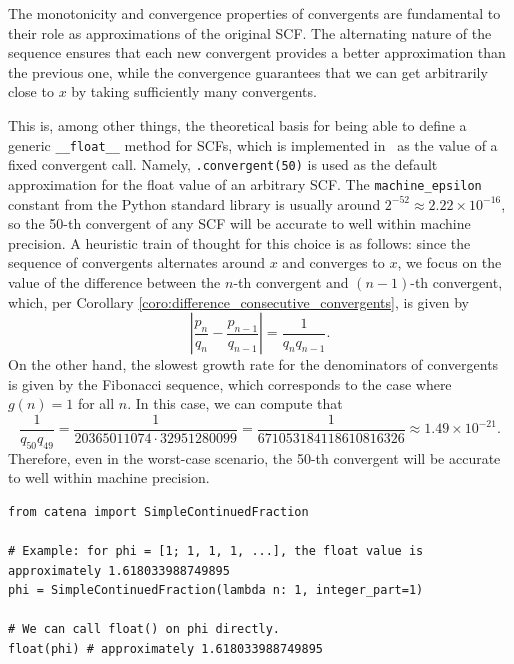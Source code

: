 \begin{remark}
    The monotonicity and convergence properties of convergents are fundamental to their role as approximations of the original SCF. 
    The alternating nature of the sequence ensures that each new convergent provides a better approximation than the previous one, 
    while the convergence guarantees that we can get arbitrarily close to $x$ by taking sufficiently many convergents.

    This is, among other things, the theoretical basis for being able to define a generic \texttt{\_\_float\_\_} method for SCFs, 
    which is implemented in \catena\ as the value of a fixed convergent call. Namely, \texttt{.convergent(50)} is used as the 
    default approximation for the float value of an arbitrary SCF. The \texttt{machine\_epsilon} constant from the 
    Python standard library is usually around $2^{-52} \approx 2.22 \times 10^{-16}$, so the 50-th 
    convergent of any SCF will be accurate to well within machine precision. A heuristic train of thought for this choice 
    is as follows: since the sequence of convergents alternates around $x$ and converges to $x$, we 
    focus on the value of the difference between the $n$-th convergent and $(n-1)$-th convergent, which, per Corollary \ref{coro:difference_consecutive_convergents}, is given by
    \[
        \left| \frac{p_n}{q_n} - \frac{p_{n-1}}{q_{n-1}} \right| = \frac{1}{q_n q_{n-1}}.
    \]
    On the other hand, the slowest growth rate for the denominators of convergents is given by the Fibonacci sequence, 
    which corresponds to the case where $g(n) = 1$ for all $n$. In this case, we can compute that
    \[
        \frac{1}{q_{50} q_{49}} = \frac{1}{20365011074 \cdot 32951280099} = \frac{1}{671053184118610816326} \approx 1.49 \times 10^{-21}.
    \]
    Therefore, even in the worst-case scenario, the 50-th convergent will be accurate to well within machine precision.
\end{remark}

\begin{catenadef}
\begin{lstlisting}[style=python]
from catena import SimpleContinuedFraction

# Example: for phi = [1; 1, 1, 1, ...], the float value is approximately 1.618033988749895
phi = SimpleContinuedFraction(lambda n: 1, integer_part=1)

# We can call float() on phi directly.
float(phi) # approximately 1.618033988749895
\end{lstlisting}
\end{catenadef}

